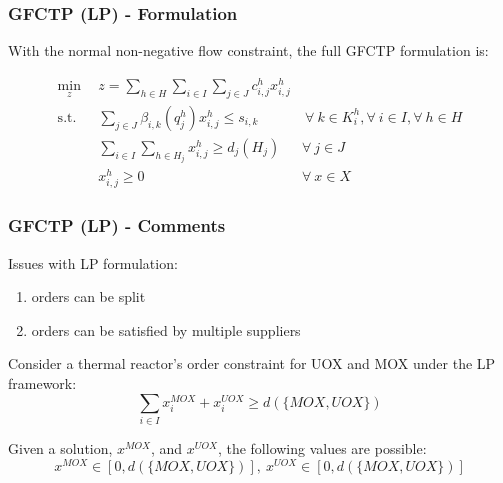 \begin{frame}[ctb!]
  \frametitle{GFCTP (LP) - Formulation} 

  With the normal non-negative flow constraint, the full GFCTP formulation is:
  
  \begin{subequations}\label{eqs:GFCTP-LP}
    \begin{align}
      \min_{z} \:\: & 
      z = \sum_{h \in H}\sum_{i \in I}\sum_{j \in J}c_{i,j}^{h} x_{i,j}^{h} 
      & \label{eqs:GFCTP-LP_obj} \\
      \text{s.t.} \:\: &
      \sum_{j \in J}\beta_{i,k}(q_{j}^{h}) x_{i,j}^{h} \leq s_{i,k} 
      &
      \: \forall \: k \in K_{i}^{h},  
      \forall \: i \in I, \forall \: h \in H \label{eqs:GFCTP-LP_sup} \\
      &
      \sum_{i \in I}\sum_{h \in H_{j}} x_{i,j}^{h} \geq d_{j}(H_{j}) 
      & 
      \forall \: j \in J \label{eqs:GFCTP-LP_dem} \\
      &
      x^h_{i,j} \geq 0
      &
      \forall \: x \in X \label{eqs:GFCTP-LP_x}
    \end{align}
  \end{subequations}
\end{frame}

\begin{frame}[ctb!]
  \frametitle{GFCTP (LP) - Comments} 
  
  Issues with LP formulation:
  \begin{enumerate}
    \item orders can be split
    \item orders can be satisfied by multiple suppliers
  \end{enumerate}

  Consider a thermal reactor's order constraint for UOX and MOX under the LP
  framework:
  \begin{equation}
    \sum_{i \in I} x_{i}^{MOX} + x_{i}^{UOX} \geq d(\{MOX,UOX\})
  \end{equation} 

  Given a solution, $x^{MOX}$, and $x^{UOX}$, the following values are possible:
  \begin{equation}
    x^{MOX} \in [0, d(\{MOX,UOX\})], \: x^{UOX} \in [0, d(\{MOX,UOX\})]
  \end{equation} 

\end{frame}

